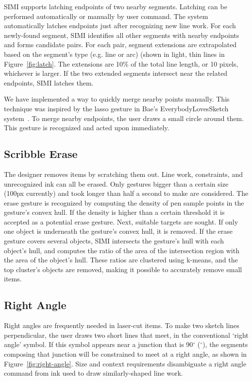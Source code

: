 \documentclass{chi-ext}
\begin{document}
SIMI supports latching endpoints of two nearby segments. Latching can
be performed automatically or manually by user command. The system
automatically latches endpoints just after recognizing new line
work. For each newly-found segment, SIMI identifies all other segments
with nearby endpoints and forms candidate pairs. For each pair,
segment extensions are extrapolated based on the segment's type
(e.g. line or arc) (shown in light, thin lines in
Figure~\ref{fig:latch}. The extensions are 10\% of the total line
length, or 10 pixels, whichever is larger. If the two extended
segments intersect near the related endpoints, SIMI latches them.

We have implemented a way to quickly merge nearby points
manually. This technique was inspired by the lasso gesture in Bae's
EverybodyLovesSketch system~\cite{bae-everybody}. To merge nearby
endpoints, the user draws a small circle around them. This gesture is
recognized and acted upon immediately.

\subsection{Scribble Erase}

The designer removes items by scratching them out. Line work,
constraints, and unrecognized ink can all be erased. Only gestures
bigger than a certain size (100px currently) and took longer than half
a second to make are considered. The erase gesture is recognized by
computing the density of pen sample points in the gesture's convex
hull. If the density is higher than a certain threshold it is accepted
as a potential erase gesture. Next, suitable targets are sought. If
only one object is underneath the gesture's convex hull, it is
removed. If the erase gesture covers several objects, SIMI intersects
the gesture's hull with each object's hull, and computes the ratio of
the area of the intersection region with the area of the object's
hull. These ratios are clustered using k-means, and the top cluster's
objects are removed, making it possible to accurately remove small
items.

\subsection{Right Angle}

Right angles are frequently needed in laser-cut items. To make two
sketch lines perpendicular, the user draws two short lines that meet,
in the conventional `right angle' symbol. If this symbol appears near
a junction that is 90$^{\circ}$ ($^{\circ}$), the segments
composing that junction will be constrained to meet at a right angle,
as shown in Figure~\ref{fig:right-angle}. Size and context
requirements disambiguate a right angle command from
ink used to draw similarly-shaped line work.
\end{document}
